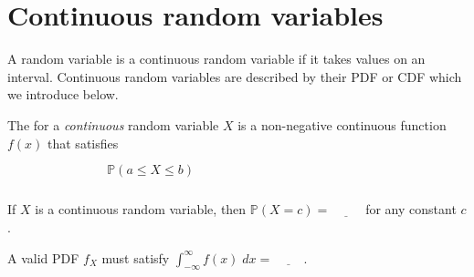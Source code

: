 \documentclass[../main.tex]{subfiles}
\begin{document}
 \section{Continuous random variables}

A random variable is a continuous random variable if it takes values on an interval.  Continuous random variables are described by their PDF or CDF which we introduce below. 

\begin{definition}
  The  for a \emph{continuous} random variable \(X\) is a non-negative continuous function \(f(x)\) that satisfies
  \[
    \mathbb{P}(a \le X \le b) \phantom{ = \int_{a}^{b} f(x) \;dx.} \hspace{1in}
  \]
\end{definition}

\faStar{} If \(X\) is a continuous random variable, then \(\mathbb{P}(X = c) = \underline{\hspace{1cm}}\) for any constant \(c\).

\faStar{} A valid PDF \(f_{X}\) must satisfy \(\int_{-\infty}^{\infty} f(x) \;dx = \underline{\hspace{1cm}}\). 
\end{document}
